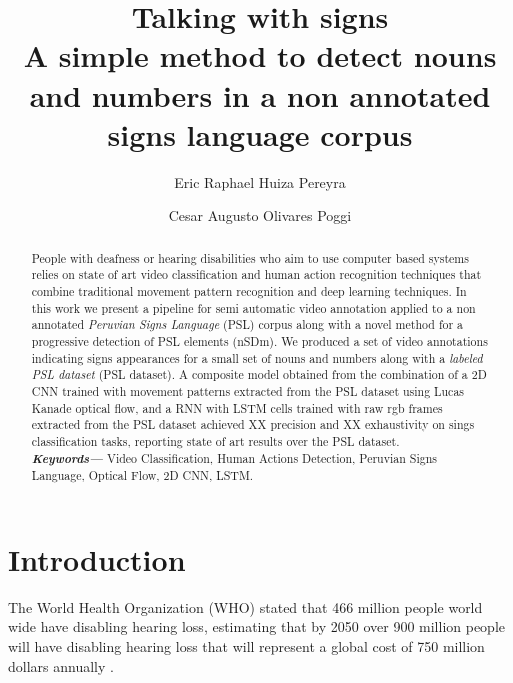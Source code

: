 \documentclass[twocolumn,conference]{article}
\providecommand{\keywords}[1]
{
  \small	
  \textbf{\textit{Keywords---}} #1
}
\begin{document}
\author[1]{Eric Raphael Huiza Pereyra}

\author[2]{Cesar Augusto Olivares Poggi}

\title{%
	\vspace{-2.0cm}
	\textbf{Talking with signs} \\	
	\Large \textbf{A simple method to detect nouns and numbers in a non annotated signs language corpus}
}

\maketitle
    
\begin{abstract}
People with deafness or hearing disabilities who aim to use computer based systems relies on state of art video classification and human action recognition techniques that combine traditional movement pattern recognition and deep learning techniques. In this work we present a pipeline for semi automatic video annotation applied to a non annotated \textit{Peruvian Signs Language} (PSL) corpus along with a novel method for a progressive detection of PSL elements (nSDm). We produced a set of video annotations indicating signs appearances for a small set of nouns and numbers along with a \textit{labeled PSL dataset} (PSL dataset). A composite model obtained from the combination of a 2D CNN trained with movement patterns extracted from the PSL dataset using Lucas Kanade optical flow, and a RNN with LSTM cells trained with raw rgb frames extracted from the PSL dataset achieved XX precision and XX exhaustivity on sings classification tasks, reporting state of art results over the PSL dataset. \\
\keywords{Video Classification, Human Actions Detection, Peruvian Signs Language, Optical Flow, 2D CNN, LSTM.}
\end{abstract}

\section{Introduction}\label{intro}
The World Health Organization (WHO) stated that 466 million people world wide have disabling hearing loss, estimating that by 2050 over 900 million people will have disabling hearing loss that will represent a global cost of 750 million dollars annually \cite{deafness_and_hearing_loss_2019}. 
\end{document}

